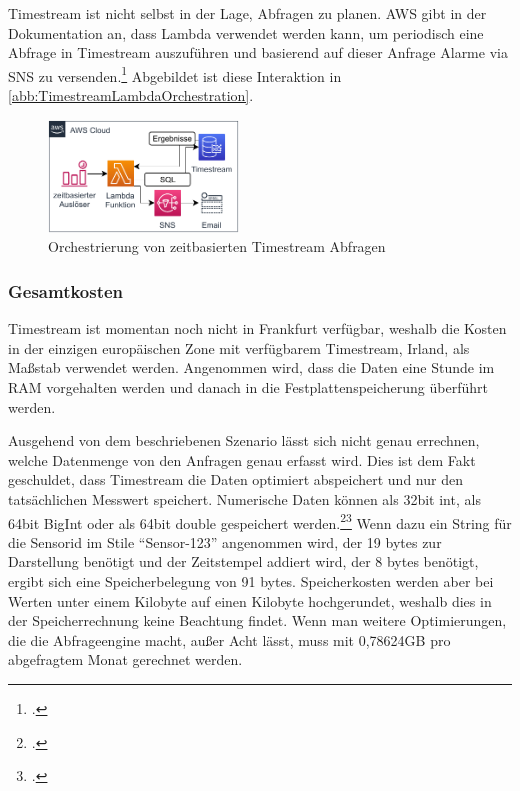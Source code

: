 Timestream ist nicht selbst in der Lage, Abfragen zu planen. \ac{AWS} gibt in der Dokumentation an, dass Lambda verwendet werden kann, um periodisch eine Abfrage in Timestream auszuführen und basierend auf dieser Anfrage Alarme via \ac{SNS} zu versenden.\footcite[Vgl.][]{AmazonWebServicesInc..o.J.ag} Abgebildet ist diese Interaktion in \autoref{abb:TimestreamLambdaOrchestration}.


\begin{figure}[H]
\centering
\includegraphics[width=0.45\textwidth]{graphics/Lambda-Timestream-Orchestration.pdf}
\caption{Orchestrierung von zeitbasierten Timestream Abfragen}
\label{abb:TimestreamLambdaOrchestration}
\end{figure}

\subsubsection{Gesamtkosten}


Timestream ist momentan noch nicht in Frankfurt verfügbar, weshalb die Kosten in der einzigen europäischen Zone mit verfügbarem Timestream, Irland, als Maßstab verwendet werden. Angenommen wird, dass die Daten eine Stunde im \ac{RAM} vorgehalten werden und danach in die Festplattenspeicherung überführt werden.

Ausgehend von dem beschriebenen Szenario lässt sich nicht genau errechnen, welche Datenmenge von den Anfragen genau erfasst wird. Dies ist dem Fakt geschuldet, dass Timestream die Daten optimiert abspeichert und nur den tatsächlichen Messwert speichert. Numerische Daten können als 32bit int, als 64bit BigInt oder als 64bit double gespeichert werden.\footcite[Vgl. auch im Folgenden][]{AmazonWebServicesInc..o.J.r}\nzitat\footcite[Vgl. auch im Folgenden][]{AmazonWebServicesInc..o.J.q} Wenn dazu ein String für die Sensorid im Stile \enquote{Sensor-123} angenommen wird, der 19 bytes zur Darstellung benötigt und der Zeitstempel addiert wird, der 8 bytes benötigt, ergibt sich eine Speicherbelegung von 91 bytes. Speicherkosten werden aber bei Werten unter einem Kilobyte auf einen Kilobyte hochgerundet, weshalb dies in der Speicherrechnung keine Beachtung findet. Wenn man weitere Optimierungen, die die Abfrageengine macht, außer Acht lässt, muss mit 0,78624GB pro abgefragtem Monat gerechnet werden.


